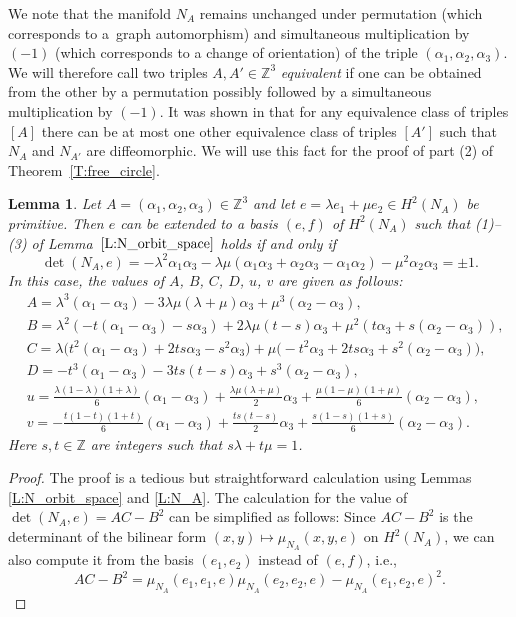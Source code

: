 \documentclass[pdftex]{sigma}
\numberwithin{equation}{section}
\newtheorem{Lemma}[Theorem]{Lemma}
\theoremstyle{definition}
\numberwithin{table}{section}
\newcommand{\Z}{\mathbb{Z}}
\begin{document}
We note that the manifold $N_A$ remains unchanged under permutation (which corresponds to a~graph automorphism) and simultaneous multiplication by $(-1)$ (which corresponds to a change of orientation) of the triple $(\alpha_1,\alpha_2,\alpha_3)$. We will therefore call two triples $A,A'\in\Z^3$ \emph{equivalent} if one can be obtained from the other by a permutation possibly followed by a simultaneous multiplication by $(-1)$. It was shown in \cite[Proposition 4.12]{Re24b} that for any equivalence class of triples $[A]$ there can be at most one other equivalence class of triples $[A']$ such that $N_A$ and $N_{A'}$ are diffeomorphic. We will use this fact for the proof of part (2) of Theorem~\ref{T:free_circle}.


\begin{Lemma}\label{L:N_A_inv}
	Let $A=(\alpha_1,\alpha_2,\alpha_3)\in\Z^3$ and let $e=\lambda e_1+\mu e_2\in H^2(N_A)$ be primitive. Then $e$ can be extended to a basis $(e,f)$ of $H^2(N_A)$ such that {\rm (1)--(3)} of Lemma~$\ref{L:N_orbit_space}$ holds if and only if
	\[ \det(N_A,e)=-\lambda^2\alpha_1\alpha_3-\lambda\mu(\alpha_1\alpha_3+\alpha_2\alpha_3-\alpha_1\alpha_2)-\mu^2\alpha_2\alpha_3=\pm1. \]
	In this case, the values of $A$, $B$, $C$, $D$, $u$, $v$ are given as follows:
	\begin{align*}
		&A=\lambda^3(\alpha_1-\alpha_3)-3\lambda\mu(\lambda+\mu)\alpha_3+\mu^3(\alpha_2-\alpha_3),\\
		&B=\lambda^2(-t(\alpha_1-\alpha_3)-s\alpha_3)+2\lambda\mu(t-s)\alpha_3+\mu^2(t\alpha_3+s(\alpha_2-\alpha_3)),\\
		&C=\lambda\bigl(t^2(\alpha_1-\alpha_3)+2ts\alpha_3-s^2\alpha_3\bigr)+\mu\bigl(-t^2\alpha_3+2ts\alpha_3+s^2(\alpha_2-\alpha_3)\bigr),\\
		&D=-t^3(\alpha_1-\alpha_3)-3ts(t-s)\alpha_3+s^3(\alpha_2-\alpha_3),\\
		&u=\frac{\lambda(1-\lambda)(1+\lambda)}{6}(\alpha_1-\alpha_3)+\frac{\lambda\mu(\lambda+\mu)}{2}\alpha_3+\frac{\mu(1-\mu)(1+\mu)}{6}(\alpha_2-\alpha_3),\\
		&v=-\frac{t(1-t)(1+t)}{6}(\alpha_1-\alpha_3)+\frac{ts(t-s)}{2}\alpha_3+\frac{s(1-s)(1+s)}{6}(\alpha_2-\alpha_3).
	\end{align*}
	Here $s,t\in\Z$ are integers such that $s\lambda+t\mu=1$.
\end{Lemma}
\begin{proof}
	The proof is a tedious but straightforward calculation using Lemmas \ref{L:N_orbit_space} and \ref{L:N_A}. The calculation for the value of $\det(N_A,e)=AC-B^2$ can be simplified as follows: Since $AC-B^2$ is the determinant of the bilinear form $(x,y)\mapsto \mu_{N_A}(x,y,e)$ on $H^2(N_A)$, we can also compute it from the basis $(e_1,e_2)$ instead of $(e,f)$, i.e.,
\[
 AC-B^2=\mu_{N_A}(e_1,e_1,e)\mu_{N_A}(e_2,e_2,e)-\mu_{N_A}(e_1,e_2,e)^2. \tag*{\qed}
\]
\renewcommand{\qed}{}
\end{proof}
\end{document}
